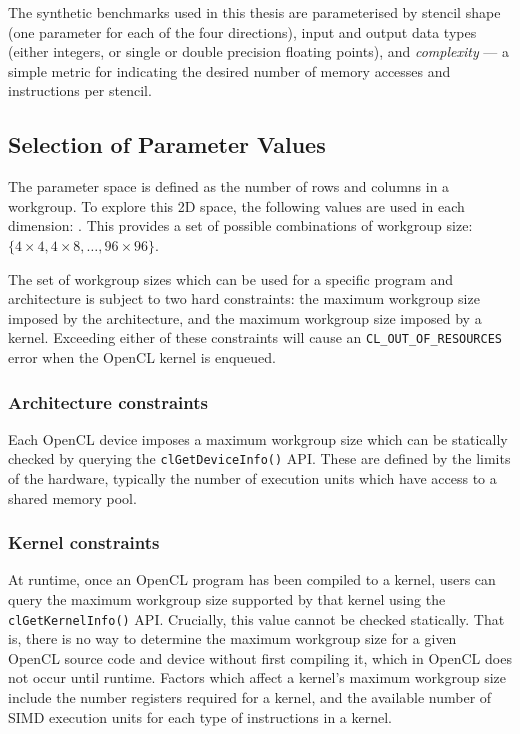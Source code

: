 The synthetic benchmarks used in this thesis are parameterised by
stencil shape (one parameter for each of the four directions), input
and output data types (either integers, or single or double precision
floating points), and \emph{complexity} --- a simple metric for
indicating the desired number of memory accesses and instructions per
stencil.


\subsection{Selection of Parameter Values}

The parameter space is defined as the number of rows and columns in a
workgroup. To explore this 2D space, the following values are used in
each dimension: . This provides a set of
 possible combinations of workgroup size:
$\{ 4\times4, 4\times8, \ldots, 96\times96 \}$. 


The set of workgroup sizes which can be used for a specific program
and architecture is subject to two hard constraints: the maximum
workgroup size imposed by the architecture, and the maximum workgroup
size imposed by a kernel. Exceeding either of these constraints will
cause an \texttt{CL\_OUT\_OF\_RESOURCES} error when the OpenCL kernel
is enqueued.

\subsubsection{Architecture constraints}

Each OpenCL device imposes a maximum workgroup size which can be
statically checked by querying the \texttt{clGetDeviceInfo()}
API. These are defined by the limits of the hardware, typically the
number of execution units which have access to a shared memory pool.

\subsubsection{Kernel constraints}

At runtime, once an OpenCL program has been compiled to a kernel,
users can query the maximum workgroup size supported by that kernel
using the \texttt{clGetKernelInfo()} API. Crucially, this value cannot
be checked statically. That is, there is no way to determine the
maximum workgroup size for a given OpenCL source code and device
without first compiling it, which in OpenCL does not occur until
runtime. Factors which affect a kernel's maximum workgroup size
include the number registers required for a kernel, and the available
number of SIMD execution units for each type of instructions in a
kernel.


